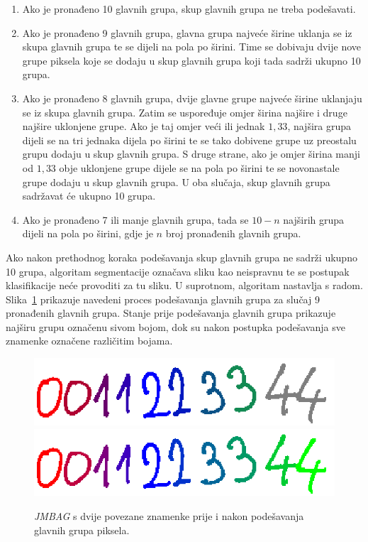 \begin{enumerate}
    \item Ako je pronađeno 10 glavnih grupa, skup glavnih grupa ne treba podešavati.
    \item Ako je pronađeno 9 glavnih grupa, glavna grupa najveće širine uklanja se iz skupa glavnih grupa te se dijeli
    na pola po širini. Time se dobivaju dvije nove grupe piksela koje se dodaju u skup glavnih grupa koji tada sadrži
    ukupno 10 grupa.
    \item Ako je pronađeno 8 glavnih grupa, dvije glavne grupe najveće širine uklanjaju se iz skupa glavnih grupa.
    Zatim se uspoređuje omjer širina najšire i druge najšire uklonjene grupe. Ako je taj omjer veći ili jednak $1{,}33$,
    najšira grupa dijeli se na tri jednaka dijela po širini te se tako dobivene grupe uz preostalu grupu dodaju u skup
    glavnih grupa. S druge strane, ako je omjer širina manji od $1{,}33$ obje uklonjene grupe dijele se na pola po
    širini te se novonastale grupe dodaju u skup glavnih grupa. U oba slučaja, skup glavnih grupa sadržavat će ukupno
    10 grupa.
    \item Ako je pronađeno 7 ili manje glavnih grupa, tada se $10 - n$ najširih grupa dijeli na pola po širini, gdje je
    $n$ broj pronađenih glavnih grupa.
\end{enumerate}
Ako nakon prethodnog koraka podešavanja skup glavnih grupa ne sadrži ukupno 10 grupa, algoritam segmentacije označava
sliku kao neispravnu te se postupak klasifikacije neće provoditi za tu sliku. U suprotnom, algoritam nastavlja s radom.
Slika\ \ref{fig:segmentation-division} prikazuje navedeni proces podešavanja glavnih grupa za slučaj 9 pronađenih glavnih
grupa. Stanje prije podešavanja glavnih grupa prikazuje najširu grupu označenu sivom bojom, dok su nakon postupka
podešavanja sve znamenke označene različitim bojama.\\
\begin{figure}[htb]
    \centering
    \includegraphics[width=12cm]{images/chapter4/segmentation-before-division.png}
    \includegraphics[width=12cm]{images/chapter4/segmentation-after-division.png}
    \caption{\emph{JMBAG} s dvije povezane znamenke prije i nakon podešavanja glavnih grupa piksela.}
    \label{fig:segmentation-division}
\end{figure}
